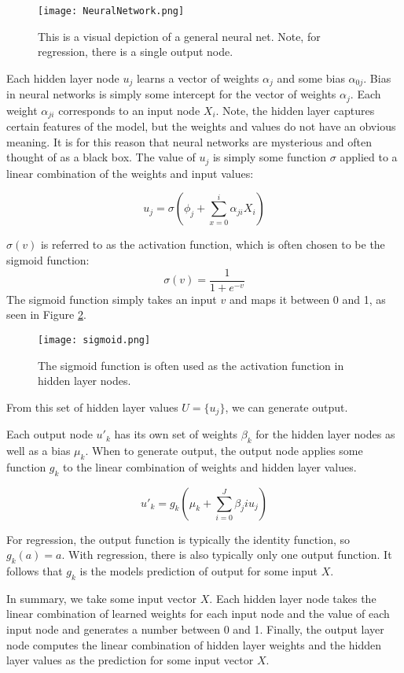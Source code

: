 \documentclass[12pt]{article}
\begin{document}
\begin{figure}[ht]
	\centering
	\texttt{[image: NeuralNetwork.png]}
	\caption{This is a visual depiction of a general neural net. Note, for regression, there is a single output node. \cite{neural}}
	\label{neuralnet}
\end{figure}

Each hidden layer node $u_j$ learns a vector of weights $\alpha_j$ and some bias $\alpha_{0j}$. Bias in neural networks is simply some intercept for the vector of weights $\alpha_j$. Each weight $\alpha_{ji}$ corresponds to an input node $X_i$. Note, the hidden layer captures certain features of the model, but the weights and values do not have an obvious meaning. It is for this reason that neural networks are mysterious and often thought of as a black box. The value of $u_j$ is simply some function $\sigma$ applied to a linear combination of the weights and input values:

$$u_j = \sigma(\phi_{j} + \sum_{x=0}^{i}\alpha_{ji} X_i)$$

$\sigma(v)$ is referred to as the activation function, which is often chosen to be the sigmoid function:
$$\sigma(v) = \frac{1}{1+e^{-v}}$$
The sigmoid function simply takes an input $v$ and maps it between 0 and 1, as seen in Figure \ref{sigmoid}. 

\begin{figure}[ht]
	\centering
	\texttt{[image: sigmoid.png]}
	\caption{The sigmoid function is often used as the activation function in hidden layer nodes.}
	\label{sigmoid}
	
\end{figure}

From this set of hidden layer values $U = \{u_j\}$, we can generate output.

Each output node $u'_k$ has its own set of weights $\beta_k$ for the hidden layer nodes as well as a bias $\mu_k$. 
When to generate output, the output node applies some function $g_k$ to the linear combination of weights and hidden layer values.

$$u'_k = g_k( \mu_k + \sum_{i=0}^{J} \beta_ji u_j)$$

For regression, the output function is typically the identity function, so $g_k(a) = a$. With regression, there is also typically only one output function. It follows that $g_k$ is the models prediction of output for some input $X$.\cite[350-351]{springer}

In summary, we take some input vector $X$. Each hidden layer node takes the linear combination of learned weights for each input node and the value of each input node and generates a number between 0 and 1. Finally, the output layer node computes the linear combination of hidden layer weights and the hidden layer values as the prediction for some input vector $X$.
\end{document}
